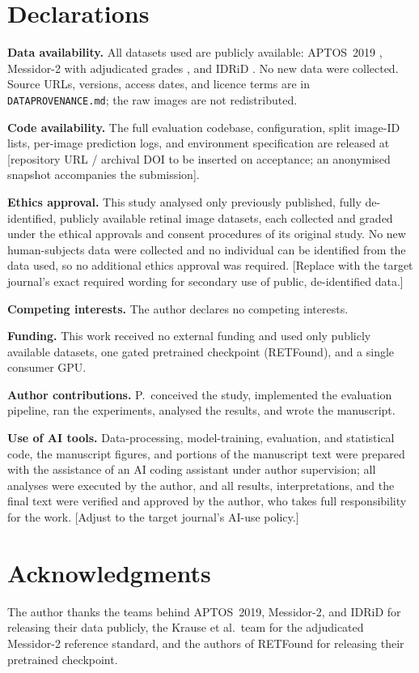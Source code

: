 \documentclass[journal]{IEEEtran}
\renewcommand{\_}{\origunderscore\allowbreak}
\begin{document}
\section*{Declarations}

\textbf{Data availability.} All datasets used are publicly available: APTOS~2019
\cite{aptos2019}, Messidor-2 \cite{decenciere2014,abramoff2013} with adjudicated
grades \cite{krause2018}, and IDRiD \cite{porwal2018,porwal2020}. No new data were
collected. Source URLs, versions, access dates, and licence terms are in
\texttt{DATA\_PROVENANCE.md}; the raw images are not redistributed.

\textbf{Code availability.} The full evaluation codebase, configuration, split
image-ID lists, per-image prediction logs, and environment specification are
released at [repository URL / archival DOI to be inserted on acceptance; an
anonymised snapshot accompanies the submission].

\textbf{Ethics approval.} This study analysed only previously published, fully
de-identified, publicly available retinal image datasets, each collected and
graded under the ethical approvals and consent procedures of its original study.
No new human-subjects data were collected and no individual can be identified from
the data used, so no additional ethics approval was required. [Replace with the
target journal's exact required wording for secondary use of public,
de-identified data.]

\textbf{Competing interests.} The author declares no competing interests.

\textbf{Funding.} This work received no external funding and used only publicly
available datasets, one gated pretrained checkpoint (RETFound), and a single
consumer GPU.

\textbf{Author contributions.} P.\ conceived the study, implemented the
evaluation pipeline, ran the experiments, analysed the results, and wrote the
manuscript.

\textbf{Use of AI tools.} Data-processing, model-training, evaluation, and
statistical code, the manuscript figures, and portions of the manuscript text
were prepared with the assistance of an AI coding assistant under author
supervision; all analyses were executed by the author, and all results,
interpretations, and the final text were verified and approved by the author, who
takes full responsibility for the work. [Adjust to the target journal's AI-use
policy.]

\section*{Acknowledgments}
The author thanks the teams behind APTOS~2019, Messidor-2, and IDRiD for
releasing their data publicly, the Krause et al.\ team for the adjudicated
Messidor-2 reference standard, and the authors of RETFound for releasing their
pretrained checkpoint.



\end{document}
